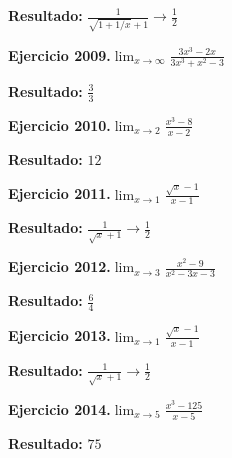 \documentclass[10pt,a4paper]{article}
\begin{document}
\begin{solbox}
\textbf{Resultado:} \(\displaystyle \frac{1}{\sqrt{1+1/x}+1} \to \frac{1}{2}\)
\end{solbox}

\newpage
\begin{ejbox}
\textbf{Ejercicio 2009.}\quad $\lim_{x\to \infty} \frac{3x^3 - 2x}{3x^3 + x^2 - 3}$
\end{ejbox}

\begin{solbox}
\textbf{Resultado:} \(\displaystyle \frac{3}{3}\)
\end{solbox}

\begin{ejbox}
\textbf{Ejercicio 2010.}\quad $\lim_{x\to 2} \frac{x^3-8}{x-2}$
\end{ejbox}

\begin{solbox}
\textbf{Resultado:} \(\displaystyle 12\)
\end{solbox}

\begin{ejbox}
\textbf{Ejercicio 2011.}\quad $\lim_{x\to 1} \frac{\sqrt{x}-1}{x-1}$
\end{ejbox}

\begin{solbox}
\textbf{Resultado:} \(\displaystyle \frac{1}{\sqrt{x}+1} \to \frac{1}{2}\)
\end{solbox}

\newpage
\begin{ejbox}
\textbf{Ejercicio 2012.}\quad $\lim_{x\to 3} \frac{x^2-9}{x^2-3x-3}$
\end{ejbox}

\begin{solbox}
\textbf{Resultado:} \(\displaystyle \frac{6}{4}\)
\end{solbox}

\begin{ejbox}
\textbf{Ejercicio 2013.}\quad $\lim_{x\to 1} \frac{\sqrt{x}-1}{x-1}$
\end{ejbox}

\begin{solbox}
\textbf{Resultado:} \(\displaystyle \frac{1}{\sqrt{x}+1} \to \frac{1}{2}\)
\end{solbox}

\begin{ejbox}
\textbf{Ejercicio 2014.}\quad $\lim_{x\to 5} \frac{x^3-125}{x-5}$
\end{ejbox}

\begin{solbox}
\textbf{Resultado:} \(\displaystyle 75\)
\end{solbox}
\end{document}
